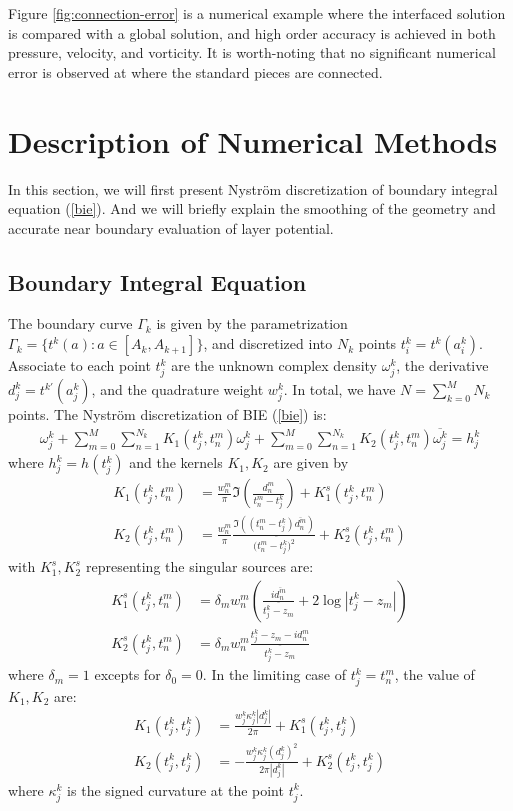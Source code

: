 \documentclass[10pt,twocolumn]{article}
\begin{document}
Figure \ref{fig:connection-error} is a numerical example 
where the interfaced solution is compared with a global solution, 
and high order accuracy is achieved in both pressure, velocity, and vorticity. 
It is worth-noting that no significant numerical error is 
observed at where the standard pieces are connected. 

\section{Description of Numerical Methods\label{sec:numericalmethod}}
In this section, 
we will first present Nystr\"om discretization of boundary integral equation (\ref{bie}). 
And we will briefly explain the smoothing of the geometry and accurate near boundary evaluation of layer potential. 

\subsection{Boundary Integral Equation}

The boundary curve $\Gamma_k$ is given by the parametrization $\Gamma_k = \{ t^k(a): a\in \left[A_k,A_{k+1}\right]\}$, 
and discretized into $N_k$ points $t^k_i = t^k(a^k_i)$. 
Associate to each point $t^k_j$ are the unknown complex density $\omega^k_j$, 
the derivative $d^k_j = t^{k\prime}(a^k_j)$, 
and the quadrature weight $w^k_j$. In total, we have $N= \sum_{k=0}^M N_k$ points. The Nystr\"om discretization of BIE (\ref{bie}) is:
\begin{align}
  \omega_j^k 
  + \sum_{m=0}^{M}\sum_{n=1}^{N_k} K_1(t^k_j,t^m_n) \omega^k_j 
  + \sum_{m=0}^{M}\sum_{n=1}^{N_k} K_2(t^k_j,t^m_n) \overline{\omega^k_j} = h^k_j
  \label{nystrom}
\end{align} where $h^k_j = h(t^k_j)$ and the kernels $K_1, K_2$ are given by 
\begin{align}
  K_1(t^k_j, t^m_n) 
  &= \frac{w^m_n}{\pi} \Im (\frac{d^m_n}{t^m_n-t^k_j}) + K_1^s(t^k_j,t^m_n)\\
  K_2(t^k_j, t^m_n) 
  &= \frac{w^m_n}{\pi} \frac{\Im((t^m_n-t^k_j)\overline{d^m_n})}{(\overline{t^m_n - t^k_j)^2}}  + K_2^s(t^k_j,t^m_n)
\end{align}
with $K_1^s, K_2^s$ representing the singular sources are: 
\begin{align}
  K_1^s(t^k_j,t^m_n) &= \delta_m w^m_n \left(\frac{i\overline{d^m_n}}{\overline{t^k_j - z_m}}
  + 2 \log |t^k_j - z_m| \right)\\
  K_2^s(t^k_j,t^m_n) &= \delta_{m}w^m_n \frac{t^k_j-z_m-id^m_n}{\overline{t^k_j - z_m}}
\end{align}
where $\delta_m = 1$ excepts for $\delta_0 = 0$. In the limiting case of $t^k_j = t^m_n$, the value of $K_1,K_2$ are:
\begin{align}
  K_1(t^k_j, t^k_j) &= \frac{w^k_j \kappa^k_j|d^k_j|}{2\pi} + K_1^s(t^k_j,t^k_j) \\
  K_2(t^k_j, t^k_j) &= -\frac{w^k_j\kappa^k_j(d^k_j)^2}{2\pi|d^k_j|} + K_2^s(t^k_j,t^k_j)
\end{align}where $\kappa^k_j$ is the signed curvature at the point $t^k_j$. 
\end{document}
